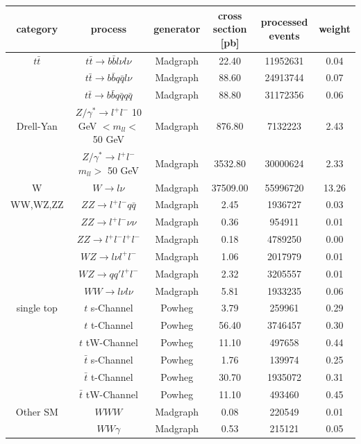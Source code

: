 \begin{table}
\small
\begin{center}
\begin{tabular}{c|c|c|c|c|c}
category & process & generator &  cross section [pb] & processed events & weight\\
\hline 
$t\bar{t}$ & $t\bar{t} \rightarrow b\bar{b}l\nu l\nu$ & Madgraph & 22.40 & 11952631 & 0.04 \\
 & $t\bar{t} \rightarrow b\bar{b}q\bar{q}l\nu$ & Madgraph & 88.60 & 24913744 & 0.07 \\
 & $t\bar{t} \rightarrow b\bar{b}q\bar{q}q\bar{q}$ & Madgraph & 88.80 & 31172356 & 0.06 \\
\hline 
Drell-Yan & $Z/\gamma^{*} \rightarrow l^{+}l^{-}$ 10 GeV $< m_{ll} <$ 50 GeV & Madgraph & 876.80 & 7132223 & 2.43 \\
 & $Z/\gamma^{*} \rightarrow l^{+}l^{-}$ $m_{ll} >$ 50 GeV & Madgraph & 3532.80 & 30000624 & 2.33 \\
\hline 
W & $W \rightarrow l\nu$ & Madgraph & 37509.00 & 55996720 & 13.26 \\
\hline 
WW,WZ,ZZ & $ZZ \rightarrow l^{+}l^{-}q\bar{q}$ & Madgraph & 2.45 & 1936727 & 0.03 \\
 & $ZZ \rightarrow l^{+}l^{-}\nu\nu$ & Madgraph & 0.36 & 954911 & 0.01 \\
 & $ZZ \rightarrow l^{+}l^{-}l^{+}l^{-}$ & Madgraph & 0.18 & 4789250 & 0.00 \\
 & $WZ \rightarrow l\nu l^{+}l^{-}$ & Madgraph & 1.06 & 2017979 & 0.01 \\
 & $WZ \rightarrow qq'l^{+}l^{-}$ & Madgraph & 2.32 & 3205557 & 0.01 \\
 & $WW \rightarrow l\nu l\nu$ & Madgraph & 5.81 & 1933235 & 0.06 \\
\hline 
single top & $t$ s-Channel & Powheg & 3.79 & 259961 & 0.29 \\
 & $t$ t-Channel & Powheg & 56.40 & 3746457 & 0.30 \\
 & $t$ tW-Channel & Powheg & 11.10 & 497658 & 0.44 \\
 & $\bar{t}$ s-Channel & Powheg & 1.76 & 139974 & 0.25 \\
 & $\bar{t}$ t-Channel & Powheg & 30.70 & 1935072 & 0.31 \\
 & $\bar{t}$ tW-Channel & Powheg & 11.10 & 493460 & 0.45 \\
\hline 
Other SM & $WWW$ & Madgraph & 0.08 & 220549 & 0.01 \\
 & $WW\gamma$ & Madgraph & 0.53 & 215121 & 0.05 \\

\end{tabular}
\end{center}
\end{table}
